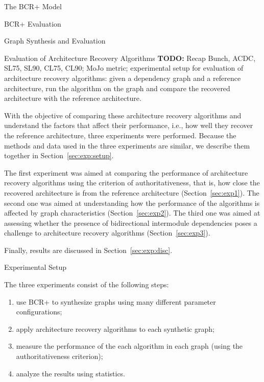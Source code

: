 \documentclass[11pt,twocolumn,a4paper,english]{article}
\newcommand{\TODO}{\textbf{TODO:} }
\begin{document}
\begin{section}{The BCR+ Model}
\begin{subsection}{BCR+ Evaluation}
\begin{subsubsection}{Graph Synthesis and Evaluation}
	
	
\end{subsubsection}

\end{subsection}	
\end{section}


\begin{section}{Evaluation of Architecture Recovery Algorithms} \label{sec:eval}
	\TODO Recap Bunch, ACDC, SL75, SL90, CL75, CL90; MoJo metric; experimental setup for evaluation of architecture recovery algorithms: given a dependency graph and a reference architecture, run the algorithm on the graph and compare the recovered architecture with the reference architecture.
	
With the objective of comparing these architecture recovery algorithms and understand the factors that affect their performance, i.e., how well they recover the reference architecture, three experiments were performed. Because the methods and data used in the three experiments are similar, we describe them together in  Section~\ref{sec:exp:setup}.

The first experiment was aimed at comparing the performance of architecture recovery algorithms using the criterion of authoritativeness, that is, how close the recovered architecture is from the reference architecture (Section~\ref{sec:exp1}).
The second one was aimed at understanding how the performance of the algorithms is affected by graph characteristics (Section~\ref{sec:exp2}).
The third one was aimed at assessing whether the presence of bidirectional intermodule dependencies poses a challenge to architecture recovery algorithms (Section~\ref{sec:exp3}).

Finally, results are discussed in Section~\ref{sec:exp:disc}.
	

\begin{subsection}{Experimental Setup} \label{sec:exp:setup}

	The three experiments consist of the following steps:
	
	\begin{enumerate}
		\item use BCR+ to synthesize graphs using many different parameter configurations;
		\item apply architecture recovery algorithms to each synthetic graph;
		\item measure the performance of the each algorithm in each graph (using the authoritativeness criterion);
		\item analyze the results using statistics.
	\end{enumerate}
	

\end{subsection}
\end{section}
\end{document}
